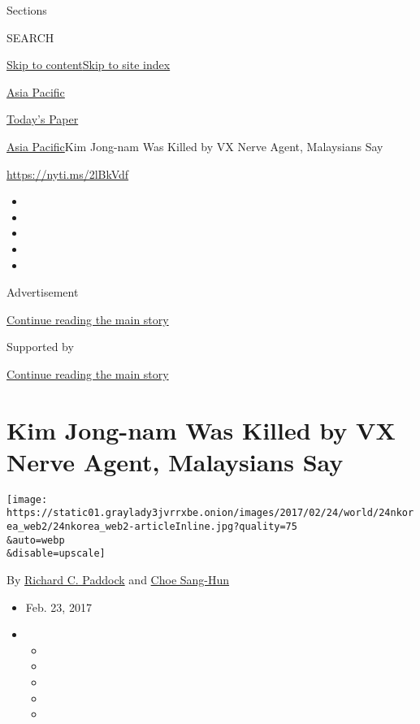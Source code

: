Sections

SEARCH

\protect\hyperlink{site-content}{Skip to
content}\protect\hyperlink{site-index}{Skip to site index}

\href{https://www.nytimes3xbfgragh.onion/section/world/asia}{Asia
Pacific}

\href{https://myaccount.nytimes3xbfgragh.onion/auth/login?response_type=cookie\&client_id=vi}{}

\href{https://www.nytimes3xbfgragh.onion/section/todayspaper}{Today's
Paper}

\href{/section/world/asia}{Asia Pacific}\textbar{}Kim Jong-nam Was
Killed by VX Nerve Agent, Malaysians Say

\url{https://nyti.ms/2lBkVdf}

\begin{itemize}
\item
\item
\item
\item
\item
\end{itemize}

Advertisement

\protect\hyperlink{after-top}{Continue reading the main story}

Supported by

\protect\hyperlink{after-sponsor}{Continue reading the main story}

\hypertarget{kim-jong-nam-was-killed-by-vx-nerve-agent-malaysians-say}{%
\section{Kim Jong-nam Was Killed by VX Nerve Agent, Malaysians
Say}\label{kim-jong-nam-was-killed-by-vx-nerve-agent-malaysians-say}}

\texttt{[image: https://static01.graylady3jvrrxbe.onion/images/2017/02/24/world/24nkorea\_web2/24nkorea\_web2-articleInline.jpg?quality=75\\\&auto=webp\\\&disable=upscale]}

By
\href{https://www.nytimes3xbfgragh.onion/by/richard-c-paddock}{Richard
C. Paddock} and
\href{http://www.nytimes3xbfgragh.onion/by/choe-sang-hun}{Choe Sang-Hun}

\begin{itemize}
\item
  Feb. 23, 2017
\item
  \begin{itemize}
  \item
  \item
  \item
  \item
  \item
  \end{itemize}
\end{itemize}

